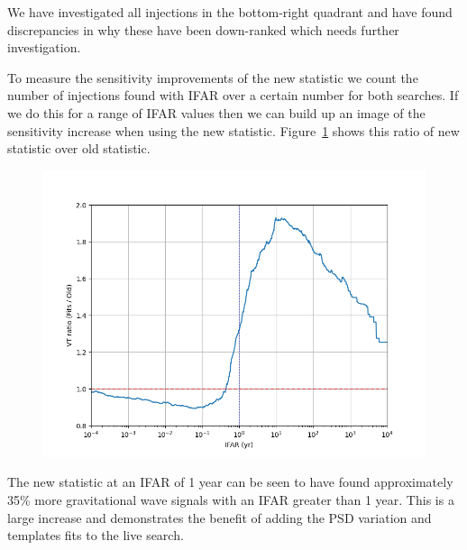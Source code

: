 We have investigated all injections in the bottom-right quadrant and have found discrepancies in why these have been down-ranked which needs further investigation.

To measure the sensitivity improvements of the new statistic we count the number of injections found with IFAR over a certain number for both searches. If we do this for a range of IFAR values then we can build up an image of the sensitivity increase when using the new statistic. Figure~\ref{fig:pycbclive-sensitivity} shows this ratio of new statistic over old statistic.
%
\begin{figure}
       \centering
    \includegraphics[width=1.0\textwidth]{images/pycbclive/ratio.png}
    \caption{}
    \label{fig:pycbclive-sensitivity}
\end{figure}
%
The new statistic at an IFAR of 1 year can be seen to have found approximately 35\% more gravitational wave signals with an IFAR greater than 1 year. This is a large increase and demonstrates the benefit of adding the PSD variation and templates fits to the live search.


